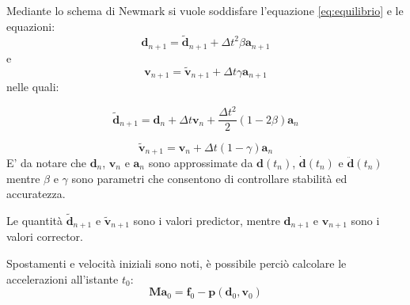 Mediante lo schema di Newmark si vuole soddisfare l'equazione \ref{eq:equilibrio} e le equazioni:
\begin{equation}
	\boldsymbol{d}_{n+1} = \boldsymbol{\tilde{d}}_{n+1} + {\varDelta t}^2  \beta \boldsymbol{a}_{n+1}
\end{equation}
e
\begin{equation}
	\boldsymbol{v}_{n+1} = \boldsymbol{\tilde{v}}_{n+1} + {\varDelta t} \gamma \boldsymbol{a}_{n+1}
\end{equation}
nelle quali:

\begin{equation}
		 \boldsymbol{\tilde{d}}_{n+1} = \boldsymbol{d}_n + \varDelta t \boldsymbol{v}_n + \frac{\varDelta t^2 }{2} (1 - 2 \beta) \boldsymbol{a}_n
\end{equation}

\begin{equation}
	 \boldsymbol{\tilde{v}}_{n+1} = \boldsymbol{v}_n + \varDelta t (1 - \gamma) \boldsymbol{a}_n 
\end{equation}
E' da notare che $\boldsymbol{d}_n$, $\boldsymbol{v}_n$ e $\boldsymbol{a}_n$ 
sono approssimate da $\boldsymbol{d}(t_n)$, $\boldsymbol{\dot{d}}(t_n)$ e $\boldsymbol{\ddot{d}}(t_n)$ 
mentre $\beta$ e $\gamma$ sono parametri che consentono di controllare stabilità ed accuratezza.

Le quantità $\boldsymbol{\tilde{d}}_{n+1}$ e $\boldsymbol{\tilde{v}}_{n+1}$ sono i valori predictor, 
mentre $\boldsymbol{d}_{n+1}$ e $\boldsymbol{v}_{n+1}$ sono i valori corrector. 

Spostamenti e velocità iniziali sono noti, è possibile perciò calcolare le accelerazioni all'istante $t_0$:
\begin{equation}
	\boldsymbol{M a}_0 = \boldsymbol{f}_0 - \boldsymbol{p}(\boldsymbol{d}_0, \boldsymbol{v}_0)
\end{equation}


